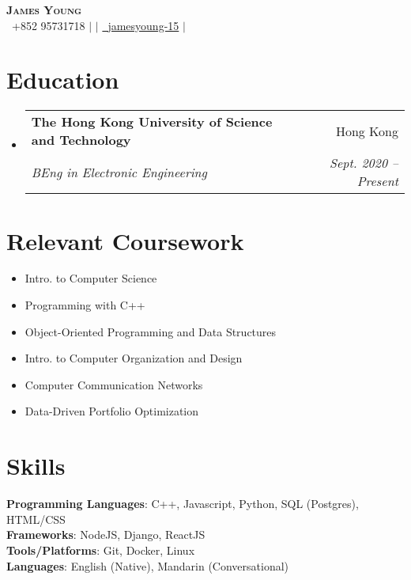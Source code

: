 \documentclass[letterpaper,12pt]{article}
\makeatletter
\newcommand{\resumeSubheading}[4]{
  \vspace{-2pt}\item
    \begin{tabular*}{0.97\textwidth}[t]{l@{\extracolsep{\fill}}r}
      \textbf{#1} & #2 \\
      \textit{\small#3} & \textit{\small #4} \\
    \end{tabular*}\vspace{-7pt}
}
\newcommand{\resumeSubHeadingListStart}{\begin{itemize}[leftmargin=0.05in, label={}]}
\newcommand{\resumeSubHeadingListEnd}{\end{itemize}}
\makeatother
\begin{document}
\begin{center}
    \textbf{\Huge \scshape James Young} \\ \vspace{2pt}
    \small  \faPhone\ {+852 95731718} $|$ 
    \href{mailto:jyyoungaa@connect.ust.hk}{} $|$ 
    \href{https://github.com/jamesyoung-15} {\faGithub\ {jamesyoung-15}} $|$
    \href{https://linkedin.com/in/jamesyyoung}{}
\end{center}


\section{Education}
  \resumeSubHeadingListStart
    \resumeSubheading
      {The Hong Kong University of Science and Technology}{Hong Kong}
      {BEng in Electronic Engineering}{Sept. 2020 -- Present}
  \resumeSubHeadingListEnd

\section{Relevant Coursework}
\vspace{-12pt}
    \begin{multicols}{2}
        \begin{itemize}[itemsep=-1pt, parsep=3pt]
        \small
            \item Intro. to Computer Science
            \item Programming with C++
            \item Object-Oriented Programming and Data Structures
            \item Intro. to Computer Organization and Design
            \item Computer Communication Networks
            \item Data-Driven Portfolio Optimization
        \end{itemize}
    \end{multicols}

\vspace{-20pt}
\section{Skills}
 \begin{itemize}[leftmargin=0.15in, label={}]
    \small{\item{
     \textbf{Programming Languages}{: C++, Javascript, Python, SQL (Postgres), HTML/CSS} \\
     \textbf{Frameworks}{: NodeJS, Django, ReactJS} \\
     \textbf{Tools/Platforms}{: Git, Docker, Linux} \\
     \textbf{Languages}{: English (Native), Mandarin (Conversational)} \\
    }}
 \end{itemize}
\end{document}
